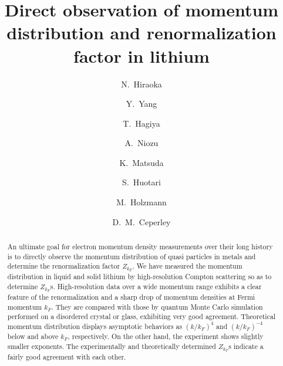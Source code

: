 \documentclass[twocolumn,showpacs,showkeys,fleqn,prl,superscriptaddress]{revtex4}%
\begin{document}

\title{
Direct observation of momentum distribution and renormalization factor in lithium
}

\author{ 
N.~Hiraoka
}

\author{ 
Y.~Yang
}

\author{ 
T.~Hagiya
}
  
\author{ 
A.~Niozu
}

\author{ 
K.~Matsuda
}

\author{ 
S.~Huotari
}


\author{ 
M.~Holzmann
}

\author{ 
D.~M.~Ceperley
}







\date{}
\begin{abstract}

An ultimate goal for electron momentum density measurements over their long history is to directly observe the momentum distribution of quasi particles in metals and determine the renormalization factor $Z_{k_F}$.
We have measured the momentum distribution in liquid and solid lithium by high-resolution Compton scattering so as to determine $Z_{k_F}$s.
High-resolution data over a wide momentum range exhibits a clear feature of the renormalization and a sharp drop of momentum densities at Fermi momentum $k_F$.
They are compared with those by quantum Monte Carlo simulation performed on a disordered crystal or glass, exhibiting very good agreement.        
Theoretical momentum distribution displays asymptotic behaviors as $(k/k_F)^4$ and $(k/k_F)^{-4}$ below and above $k_F$, respectively.
On the other hand, the experiment shows slightly smaller exponents. 
The experimentally and theoretically determined $Z_{k_F}$s indicate a fairly good agreement with each other.


\end{abstract}
\maketitle
\end{document}
